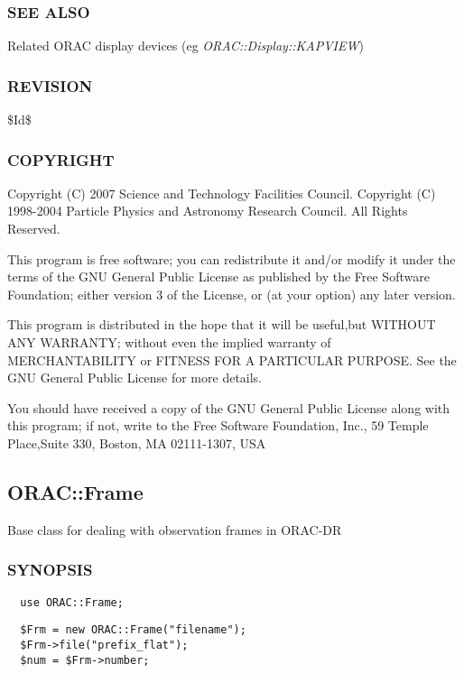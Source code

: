 \subsubsection*{SEE ALSO\label{ORAC::Display_SEE_ALSO}}


Related ORAC display devices (eg \emph{ORAC::Display::KAPVIEW})

\subsubsection*{REVISION\label{ORAC::Display_REVISION}}


\$Id\$

\subsubsection*{COPYRIGHT\label{ORAC::Display_COPYRIGHT}}


Copyright (C) 2007 Science and Technology Facilities Council.
Copyright (C) 1998-2004 Particle Physics and Astronomy Research
Council. All Rights Reserved.



This program is free software; you can redistribute it and/or modify it under
the terms of the GNU General Public License as published by the Free Software
Foundation; either version 3 of the License, or (at your option) any later
version.



This program is distributed in the hope that it will be useful,but WITHOUT ANY
WARRANTY; without even the implied warranty of MERCHANTABILITY or FITNESS FOR A
PARTICULAR PURPOSE. See the GNU General Public License for more details.



You should have received a copy of the GNU General Public License along with
this program; if not, write to the Free Software Foundation, Inc., 59 Temple
Place,Suite 330, Boston, MA  02111-1307, USA

\subsection{ORAC::Frame\label{ORAC::Frame}}


Base class for dealing with observation frames in ORAC-DR

\subsubsection*{SYNOPSIS\label{ORAC::Frame_SYNOPSIS}}
\begin{verbatim}
  use ORAC::Frame;
\end{verbatim}
\begin{verbatim}
  $Frm = new ORAC::Frame("filename");
  $Frm->file("prefix_flat");
  $num = $Frm->number;
\end{verbatim}
